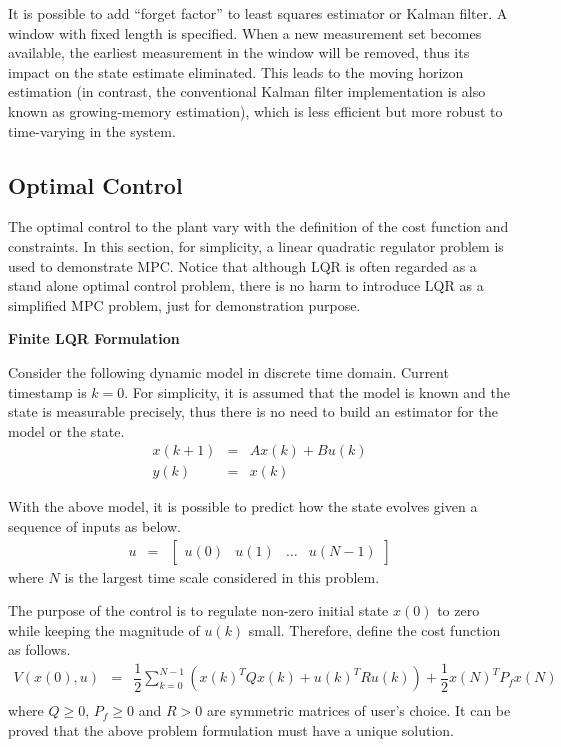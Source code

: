 It is possible to add ``forget factor'' to least squares estimator or Kalman filter. A window with fixed length is specified. When a new measurement set becomes available, the earliest measurement in the window will be removed, thus its impact on the state estimate eliminated. This leads to the moving horizon estimation (in contrast, the conventional Kalman filter implementation is also known as growing-memory estimation), which is less efficient but more robust to time-varying in the system.

\subsection{Optimal Control}

The optimal control to the plant vary with the definition of the cost function and constraints. In this section, for simplicity, a linear quadratic regulator problem is used to demonstrate MPC. Notice that although LQR is often regarded as a stand alone optimal control problem, there is no harm to introduce LQR as a simplified MPC problem, just for demonstration purpose.

\vspace{0.1in}
\noindent \textbf{Finite LQR Formulation}
\vspace{0.1in}

Consider the following dynamic model in discrete time domain. Current timestamp is $k=0$. For simplicity, it is assumed that the model is known and the state is measurable precisely, thus there is no need to build an estimator for the model or the state.
\begin{eqnarray}
  x(k+1) &=& Ax(k) + Bu(k) \label{eq:lqrexp1} \\
  y(k) &=& x(k) \label{eq:lqrexp2}
\end{eqnarray}

With the above model, it is possible to predict how the state evolves given a sequence of inputs as below.
\begin{eqnarray}
  u &=& \left[\begin{array}{cccc}
                u(0) & u(1) & \ldots & u(N-1) \nonumber
              \end{array}\right]
\end{eqnarray}
where $N$ is the largest time scale considered in this problem.

The purpose of the control is to regulate non-zero initial state $x(0)$ to zero while keeping the magnitude of $u(k)$ small. Therefore, define the cost function as follows.
\begin{eqnarray}
  V\left(x(0), u\right) &=& \dfrac{1}{2}\sum_{k=0}^{N-1}\left(x(k)^TQx(k) + u(k)^TRu(k)\right) + \dfrac{1}{2}x(N)^TP_fx(N) \nonumber \\ \label{eq:lqrexp3}
\end{eqnarray}
where $Q\geq 0$, $P_f \geq0$ and $R>0$ are symmetric matrices of user's choice. It can be proved that the above problem formulation must have a unique solution.

